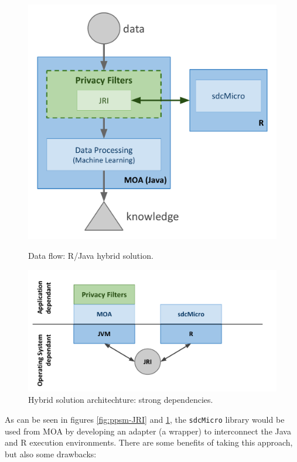 \begin{figure}[h]
	\centering
	\begin{minipage}[t]{.45\textwidth}
		\centering
		\includegraphics[width=1.0\textwidth]{figures/moa-ppsm-JRI.pdf}
		\caption{Data flow: R/Java hybrid solution.}
		\label{fig:ppsm-JRI}
	\end{minipage}\hfill
	\begin{minipage}[t]{.5\textwidth}
		\centering
		\includegraphics[width=1.2\textwidth]{figures/moa-ppsm-JRI-arch.pdf}
		\caption{Hybrid solution architechture: strong dependencies.}
		\label{fig:ppsm-JRI-arch}
	\end{minipage}
\end{figure}

As can be seen in figures \ref{fig:ppsm-JRI} and \ref{fig:ppsm-JRI-arch}, the \texttt{sdcMicro} library would be used from MOA by developing an adapter (a wrapper) to interconnect the Java and R execution environments. There are some benefits of taking this approach, but also some drawbacks:

